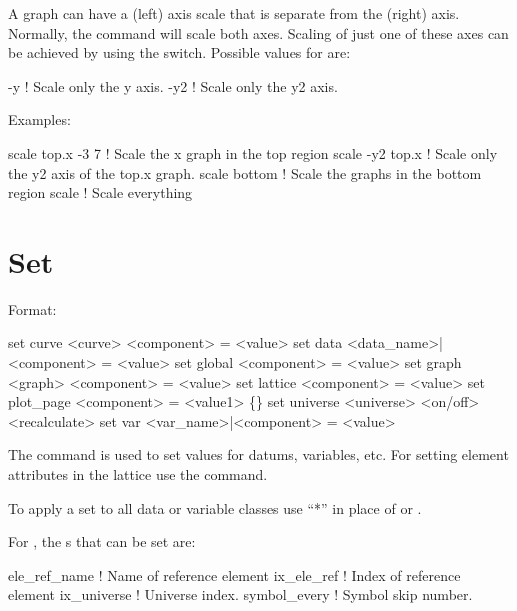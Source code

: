 A graph can have a  (left) axis scale that is separate from the  (right) 
axis. Normally, the  command will scale both axes.  Scaling of just one of these
axes can be achieved by using the  switch. Possible values for  are:
\begin{example}
  -y                 ! Scale only the y axis.
  -y2                ! Scale only the y2 axis.
\end{example}

Examples:
\begin{example}
  scale top.x -3  7  ! Scale the x graph in the top region
  scale -y2 top.x    ! Scale only the y2 axis of the top.x graph.
  scale bottom       ! Scale the graphs in the bottom region
  scale              ! Scale everything
\end{example}


\section{Set}
\label{s:set}

Format:
\begin{example}
  set curve <curve> <component> = <value>
  set data <data_name>|<component> = <value>
  set global <component> = <value>
  set graph <graph> <component> = <value>
  set lattice <component> = <value>
  set plot_page <component> = <value1> \{<value2>\}
  set universe <universe> <on/off> <recalculate>
  set var <var_name>|<component> = <value>
\end{example}

\vskip 0.2in 
The  command is used to set values for datums,
variables, etc.  For setting element attributes in the 
lattice use the  command.

To apply a set to all data or variable classes use ``*''
in place of  or .

For , the s that can be set are:
\begin{example}
  ele_ref_name   ! Name of reference element
  ix_ele_ref     ! Index of reference element
  ix_universe    ! Universe index.
  symbol_every   ! Symbol skip number.
\end{example}

